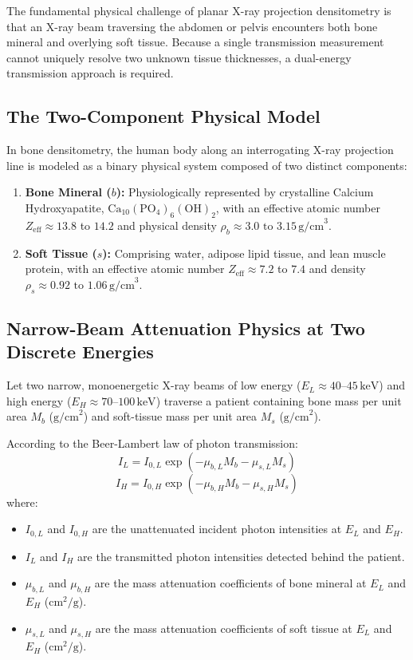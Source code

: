 \documentclass[11pt,a4paper]{article}
\begin{document}
The fundamental physical challenge of planar X-ray projection densitometry is that an X-ray beam traversing the abdomen or pelvis encounters both bone mineral and overlying soft tissue. Because a single transmission measurement cannot uniquely resolve two unknown tissue thicknesses, a dual-energy transmission approach is required.

\subsection{The Two-Component Physical Model}

In bone densitometry, the human body along an interrogating X-ray projection line is modeled as a binary physical system composed of two distinct components:
\begin{enumerate}[leftmargin=*]
    \item \textbf{Bone Mineral ($b$):} Physiologically represented by crystalline Calcium Hydroxyapatite, $\text{Ca}_{10}(\text{PO}_4)_6(\text{OH})_2$, with an effective atomic number $Z_{\text{eff}} \approx 13.8$ to $14.2$ and physical density $\rho_b \approx 3.0\text{ to }3.15\,\text{g/cm}^3$.
    \item \textbf{Soft Tissue ($s$):} Comprising water, adipose lipid tissue, and lean muscle protein, with an effective atomic number $Z_{\text{eff}} \approx 7.2$ to $7.4$ and density $\rho_s \approx 0.92\text{ to }1.06\,\text{g/cm}^3$.
\end{enumerate}

\subsection{Narrow-Beam Attenuation Physics at Two Discrete Energies}

Let two narrow, monoenergetic X-ray beams of low energy ($E_L \approx 40\text{--}45\,\text{keV}$) and high energy ($E_H \approx 70\text{--}100\,\text{keV}$) traverse a patient containing bone mass per unit area $M_b$ ($\text{g/cm}^2$) and soft-tissue mass per unit area $M_s$ ($\text{g/cm}^2$).

According to the Beer-Lambert law of photon transmission:
\begin{equation}
    I_L = I_{0,L} \exp\left( -\mu_{b,L} M_b - \mu_{s,L} M_s \right)
\end{equation}
\begin{equation}
    I_H = I_{0,H} \exp\left( -\mu_{b,H} M_b - \mu_{s,H} M_s \right)
\end{equation}
where:
\begin{itemize}[leftmargin=*]
    \item $I_{0,L}$ and $I_{0,H}$ are the unattenuated incident photon intensities at $E_L$ and $E_H$.
    \item $I_L$ and $I_H$ are the transmitted photon intensities detected behind the patient.
    \item $\mu_{b,L}$ and $\mu_{b,H}$ are the mass attenuation coefficients of bone mineral at $E_L$ and $E_H$ ($\text{cm}^2/\text{g}$).
    \item $\mu_{s,L}$ and $\mu_{s,H}$ are the mass attenuation coefficients of soft tissue at $E_L$ and $E_H$ ($\text{cm}^2/\text{g}$).
\end{itemize}
\end{document}
